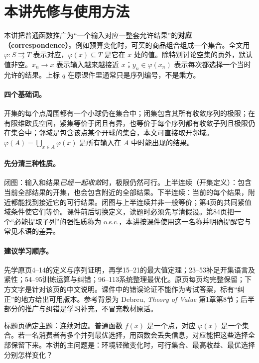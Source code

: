 \section*{本讲先修与使用方法}
本讲把普通函数推广为“一个输入对应一整套允许结果”的\textbf{对应（correspondence）}。例如预算变化时，可买的商品组合组成一个集合。全文用 $\varphi:S\rightrightarrows T$ 表示对应，$\varphi(x)\subseteq T$ 是它在 $x$ 处的值。除特别讨论空集的页外，默认值非空。$x_n\to x$ 表示输入越来越接近 $x$；$y_n\in\varphi(x_n)$ 表示每次都选择一个当时允许的结果。上标 $q$ 在原课件里通常只是序列编号，不是乘方。

\paragraph{四个基础词。}开集的每个点周围都有一个小球仍在集合中；闭集包含其所有收敛序列的极限；在有限维欧氏空间，紧集等价于闭且有界，也等价于每个序列都有收敛子列且极限仍在集合中；邻域是包含该点某个开球的集合，本文可直接取开邻域。$\varphi(A)=\bigcup_{x\in A}\varphi(x)$ 是所有输入在 $A$ 中时能出现的结果。

\paragraph{先分清三种性质。}闭图：输入和结果\emph{已经一起收敛}时，极限仍然可行。上半连续（开集定义）：包含当前全部结果的开集，也会包含附近的全部结果。下半连续：当前的每个结果，附近都能找到接近它的可行结果。闭图与上半连续并非一般等价；第4页的共同紧值域条件使它们等价。课件前后切换定义，读题时必须先写清假设。第84页把一个“必能提取子列”的强性质称为 o.s.c.，本讲按课件使用这一名称并明确提醒它与常见术语的差异。

\paragraph{建议学习顺序。}先学原页4--14的定义与序列证明，再学15--21的最大值定理；23--53补足开集语言及紧性；54--95训练运算与纠错；96--113系统整理最优化。原页每页均完整保留；下方文字是针对该页的中文说明。课件中的错误论证不能作为考试答案，标有“纠正”的地方给出可用版本。参考背景为 Debreu, \emph{Theory of Value} 第1章第8节；后半部分的推广与纠错是学习补充，不冒充教材原话。

标题页确定主题：连续对应。普通函数 $f(x)$ 是一个点，对应 $\varphi(x)$ 是一个集合。若一名消费者有多个并列最优选择，用函数会丢失信息，对应能把这些选择全部保留下来。本讲的主问题是：环境轻微变化时，可行集合、最高收益、最优选择分别怎样变化？

